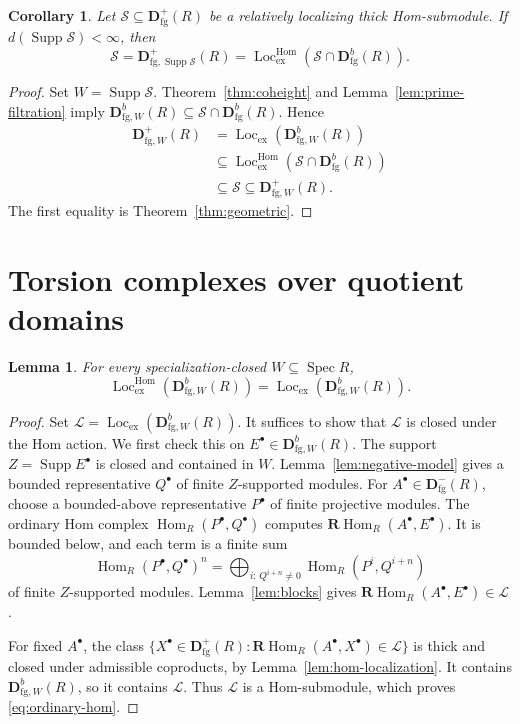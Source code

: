 \documentclass[11pt]{amsart}
\numberwithin{equation}{section}
\newtheorem{lemma}[theorem]{Lemma}
\newtheorem{corollary}[theorem]{Corollary}
\theoremstyle{definition}
\theoremstyle{remark}
\DeclareMathOperator{\Supp}{Supp}
\DeclareMathOperator{\Spec}{Spec}
\DeclareMathOperator{\Loc}{Loc}
\DeclareMathOperator{\Hom}{Hom}
\newcommand{\RHom}{\mathbf R\!\Hom}
\newcommand{\D}{\mathbf D}
\newcommand{\fg}{\mathrm{fg}}
\newcommand{\Lex}{\Loc_{\mathrm{ex}}}
\newcommand{\Lhom}{\Loc_{\mathrm{ex}}^{\Hom}}
\begin{document}
\begin{corollary}\label{cor:positive-finite}
Let $\mathcal S\subseteq\D^+_{\fg}(R)$ be a relatively localizing thick
Hom-submodule. If $d(\Supp\mathcal S)<\infty$, then
\[
 \mathcal S=\D^+_{\fg,\Supp\mathcal S}(R)
 =\Lhom(\mathcal S\cap\D^b_{\fg}(R)).
\]
\end{corollary}
\begin{proof}
Set $W=\Supp\mathcal S$. Theorem~\ref{thm:coheight} and
Lemma~\ref{lem:prime-filtration} imply
$\D^b_{\fg,W}(R)\subseteq\mathcal S\cap\D^b_{\fg}(R)$. Hence
\[
 \begin{aligned}
 \D^+_{\fg,W}(R)&=\Lex(\D^b_{\fg,W}(R))\\
 &\subseteq\Lhom(\mathcal S\cap\D^b_{\fg}(R))\\
 &\subseteq\mathcal S\subseteq\D^+_{\fg,W}(R).
 \end{aligned}
\]
The first equality is Theorem~\ref{thm:geometric}.
\end{proof}

\section{Torsion complexes over quotient domains}

\begin{lemma}\label{lem:ordinary-hom}
For every specialization-closed $W\subseteq\Spec R$,
\begin{equation}\label{eq:ordinary-hom}
 \Lhom(\D^b_{\fg,W}(R))=\Lex(\D^b_{\fg,W}(R)).
\end{equation}
\end{lemma}
\begin{proof}
Set $\mathcal L=\Lex(\D^b_{\fg,W}(R))$. It suffices to show that
$\mathcal L$ is closed under the Hom action. We first check this on
$E^{\bullet}\in\D^b_{\fg,W}(R)$. The support
$Z=\Supp E^{\bullet}$ is closed and contained in $W$. Lemma~\ref{lem:negative-model}
gives a bounded representative $Q^{\bullet}$ of finite $Z$-supported modules.
For $A^{\bullet}\in\D^-_{\fg}(R)$, choose a bounded-above representative $P^{\bullet}$ of finite
projective modules. The ordinary Hom complex $\Hom_R(P^{\bullet},Q^{\bullet})$ computes
$\RHom_R(A^{\bullet},E^{\bullet})$. It is bounded below, and each term is a finite sum
\[
 \Hom_R(P^{\bullet},Q^{\bullet})^n=\bigoplus_{i:\,Q^{i+n}\ne0}\Hom_R(P^i,Q^{i+n})
\]
of finite $Z$-supported modules. Lemma~\ref{lem:blocks} gives
$\RHom_R(A^{\bullet},E^{\bullet})\in\mathcal L$.

For fixed $A^{\bullet}$, the class
$\{X^{\bullet}\in\D^+_{\fg}(R):\RHom_R(A^{\bullet},X^{\bullet})\in\mathcal L\}$ is thick and closed under
admissible coproducts, by Lemma~\ref{lem:hom-localization}. It contains $\D^b_{\fg,W}(R)$, so it
contains $\mathcal L$. Thus $\mathcal L$ is a Hom-submodule, which proves
\eqref{eq:ordinary-hom}.
\end{proof}
\end{document}
